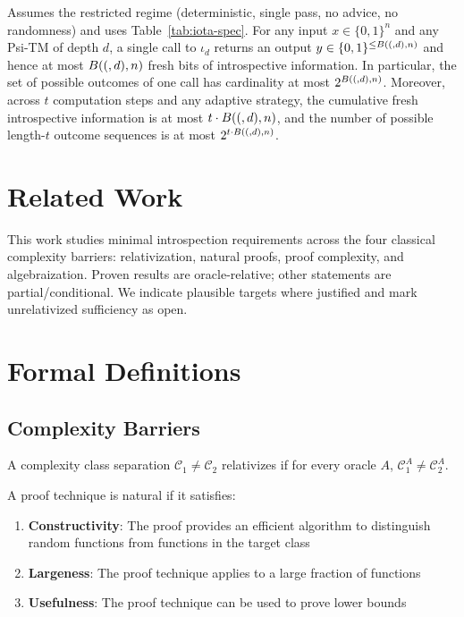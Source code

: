 
\begin{lemma}
\label{lem:one-step-budget-3}
Assumes the restricted regime (deterministic, single pass, no advice, no randomness) and uses Table~\ref{tab:iota-spec}.
For any input $x\in\{0,1\}^n$ and any Psi-TM of depth $d$, a single call to $\iota_d$ returns an output $y\in\{0,1\}^{\le B((,d),n)}$ and hence at most $B((,d),n)$ fresh bits of introspective information. In particular, the set of possible outcomes of one call has cardinality at most $2^{B((,d),n)}$. Moreover, across $t$ computation steps and any adaptive strategy, the cumulative fresh introspective information is at most $t \cdot B((,d),n)$, and the number of possible length-$t$ outcome sequences is at most $2^{t \cdot B((,d),n)}$.
\end{lemma}

\section{Related Work}

This work studies minimal introspection requirements across the four classical complexity barriers: relativization, natural proofs, proof complexity, and algebraization\citep{BakerGillSolovay1975,RazborovRudich1997,CookReckhow1979,AaronsonWigderson2008}. Proven results are oracle-relative; other statements are partial/conditional. We indicate plausible targets where justified and mark unrelativized sufficiency as open.

\section{Formal Definitions}

\subsection{Complexity Barriers}

\begin{definition}
A complexity class separation $\mathcal{C}_1 \neq \mathcal{C}_2$ relativizes if for every oracle $A$, $\mathcal{C}_1^A \neq \mathcal{C}_2^A$\citep{BakerGillSolovay1975}.
\end{definition}

\begin{definition}
A proof technique is natural if it satisfies\citep{RazborovRudich1997}:
\begin{enumerate}
\item \textbf{Constructivity}: The proof provides an efficient algorithm to distinguish random functions from functions in the target class
\item \textbf{Largeness}: The proof technique applies to a large fraction of functions
\item \textbf{Usefulness}: The proof technique can be used to prove lower bounds
\end{enumerate}
\end{definition}

